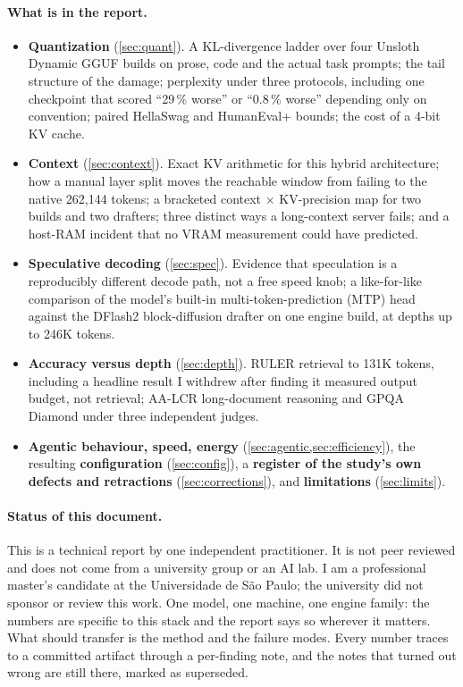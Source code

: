 \paragraph{What is in the report.}
\begin{itemize}
\item \textbf{Quantization} (\cref{sec:quant}). A KL-divergence ladder over four Unsloth Dynamic GGUF
builds on prose, code and the actual task prompts; the tail structure of the damage; perplexity under
three protocols, including one checkpoint that scored ``29\,\% worse'' or ``0.8\,\% worse'' depending
only on convention; paired HellaSwag and HumanEval+ bounds; the cost of a 4-bit KV cache.
\item \textbf{Context} (\cref{sec:context}). Exact KV arithmetic for this hybrid architecture; how a
manual layer split moves the reachable window from failing to the native 262{,}144 tokens; a bracketed
context $\times$ KV-precision map for two builds and two drafters; three distinct ways a long-context
server fails; and a host-RAM incident that no VRAM measurement could have predicted.
\item \textbf{Speculative decoding} (\cref{sec:spec}). Evidence that speculation is a reproducibly
different decode path, not a free speed knob; a like-for-like comparison of the model's built-in
multi-token-prediction (MTP) head against the DFlash2 block-diffusion drafter on one engine build, at
depths up to 246K tokens.
\item \textbf{Accuracy versus depth} (\cref{sec:depth}). RULER retrieval to 131K tokens, including a
headline result I withdrew after finding it measured output budget, not retrieval; AA-LCR long-document
reasoning and GPQA Diamond under three independent judges.
\item \textbf{Agentic behaviour, speed, energy} (\cref{sec:agentic,sec:efficiency}), the resulting
\textbf{configuration} (\cref{sec:config}), a \textbf{register of the study's own defects and
retractions} (\cref{sec:corrections}), and \textbf{limitations} (\cref{sec:limits}).
\end{itemize}

\paragraph{Status of this document.} This is a technical report by one independent practitioner. It
is not peer reviewed and does not come from a university group or an AI lab. I am a professional
master's candidate at the Universidade de S\~ao Paulo; the university did not sponsor or review this
work. One model, one machine, one engine family: the numbers are specific to this stack and the report
says so wherever it matters. What should transfer is the method and the failure modes. Every number
traces to a committed artifact through a per-finding note, and the notes that turned out wrong are
still there, marked as superseded.

